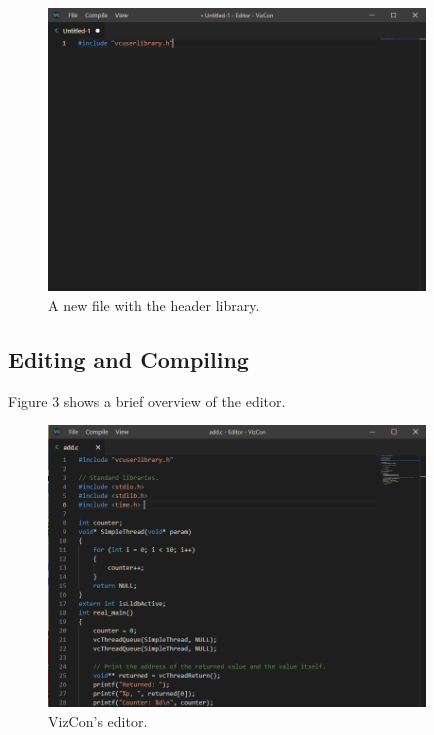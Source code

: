 \documentclass{article}
\begin{document}
\begin{figure}[H]
    \includegraphics[width=10cm]{vizconHeader}
    \centering
    \caption{A new file with the header library.}
\end{figure}


\subsection{Editing and Compiling}
Figure 3 shows a brief overview of the editor. 
\begin{figure}[h!]
    \includegraphics[width=10cm]{vizconEditor}
    \centering
    \caption{VizCon's editor.}
\end{figure}
\end{document}
